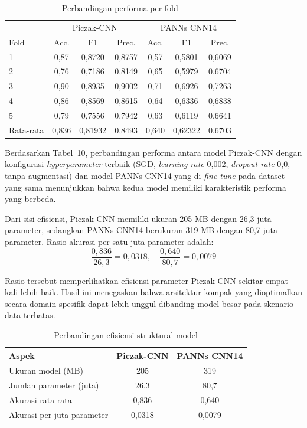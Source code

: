 \documentclass[10pt,a4paper]{jurnalvarian}
\begin{document}
\begin{table}[H]
\centering
\fontsize{8pt}{10pt}\selectfont
\caption{Perbandingan performa per fold}
\begin{tabular}{lcccccc}
\hline
 & \multicolumn{3}{c}{Piczak-CNN} & \multicolumn{3}{c}{PANNs CNN14} \\
Fold & Acc. & F1 & Prec. & Acc. & F1 & Prec. \\
\hline
1 & 0,87 & 0,8720 & 0,8757 & 0,57 & 0,5801 & 0,6069 \\
2 & 0,76 & 0,7186 & 0,8149 & 0,65 & 0,5979 & 0,6704 \\
3 & 0,90 & 0,8935 & 0,9002 & 0,71 & 0,6926 & 0,7263 \\
4 & 0,86 & 0,8569 & 0,8615 & 0,64 & 0,6336 & 0,6838 \\
5 & 0,79 & 0,7556 & 0,7942 & 0,63 & 0,6119 & 0,6641 \\
Rata-rata & 0,836 & 0,81932 & 0,8493 & 0,640 & 0,62322 & 0,6703 \\
\hline
\end{tabular}
\end{table}
Berdasarkan Tabel~10, perbandingan performa antara model Piczak-CNN dengan konfigurasi \textit{hyperparameter} terbaik (SGD, \textit{learning rate} 0{,}002, \textit{dropout rate} 0{,}0, tanpa augmentasi) dan model PANNs CNN14 yang di-\textit{fine-tune} pada dataset yang sama menunjukkan bahwa kedua model memiliki karakteristik performa yang berbeda. \par

Dari sisi efisiensi, Piczak-CNN memiliki ukuran 205 MB dengan 26,3 juta parameter, sedangkan PANNs CNN14 berukuran 319 MB dengan 80,7 juta parameter. Rasio akurasi per satu juta parameter adalah:
\begin{equation}
\frac{0{,}836}{26{,}3}=0{,}0318,\quad \frac{0{,}640}{80{,}7}=0{,}0079
\end{equation}

Rasio tersebut memperlihatkan efisiensi parameter Piczak-CNN sekitar empat kali lebih baik. Hasil ini menegaskan bahwa arsitektur kompak yang dioptimalkan secara domain-spesifik dapat lebih unggul dibanding model besar pada skenario data terbatas.

\begin{table}[H]
\centering
\fontsize{8pt}{10pt}\selectfont
\caption{Perbandingan efisiensi struktural model}
\begin{tabular}{lcc}
\hline
Aspek & Piczak-CNN & PANNs CNN14 \\
\hline
Ukuran model (MB) & 205 & 319 \\
Jumlah parameter (juta) & 26,3 & 80,7 \\
Akurasi rata-rata & 0,836 & 0,640 \\
Akurasi per juta parameter & 0,0318 & 0,0079 \\
\hline
\end{tabular}
\end{table}
\end{document}
